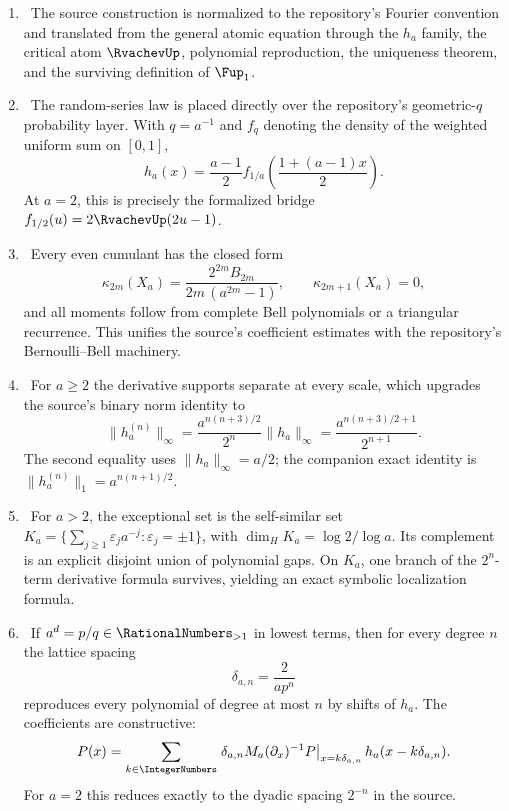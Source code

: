 \documentclass[11pt,oneside]{article}
\numberwithin{equation}{section}
\theoremstyle{definition}
\theoremstyle{remark}
\begin{document}
\begin{enumerate}
\item \sourceflag\ The source construction is normalized to the repository's
Fourier convention and translated from the general atomic equation through the
$h_a$ family, the critical atom $\RvachevUp$, polynomial reproduction, the uniqueness
theorem, and the surviving definition of $\Fup_1$.

\item \repoflag\ The random-series law is placed directly over the repository's
geometric-$q$ probability layer.  With $q=a^{-1}$ and $f_q$ denoting the density
of the weighted uniform sum on $[0,1]$,
\[
 h_a(x)=\frac{a-1}{2}
 f_{1/a}\!\left(\frac{1+(a-1)x}{2}\right).
\]
At $a=2$, this is precisely the formalized bridge
$f_{1/2}(u)=2\RvachevUp(2u-1)$.

\item \newflag\ Every even cumulant has the closed form
\[
 \kappa_{2m}(X_a)=
 \frac{2^{2m}B_{2m}}{2m\,(a^{2m}-1)},
 \qquad \kappa_{2m+1}(X_a)=0,
\]
and all moments follow from complete Bell polynomials or a triangular recurrence.
This unifies the source's coefficient estimates with the repository's
Bernoulli--Bell machinery.

\item \newflag\ For $a\ge2$ the derivative supports separate at every scale,
which upgrades the source's binary norm identity to
\[
 \|h_a^{(n)}\|_\infty
 =\frac{a^{n(n+3)/2}}{2^n}\|h_a\|_\infty
 =\frac{a^{n(n+3)/2+1}}{2^{n+1}}.
\]
The second equality uses $\|h_a\|_\infty=a/2$; the companion exact identity is
   $\|h_a^{(n)}\|_1=a^{n(n+1)/2}$.

\item \newflag\ For $a>2$, the exceptional set is the self-similar set
$K_a=\{\sum_{j\ge1}\varepsilon_j a^{-j}:\varepsilon_j=\pm1\}$, with
$\dim_H K_a=\log 2/\log a$.  Its complement is an explicit disjoint union of
polynomial gaps.  On $K_a$, one branch of the $2^n$-term derivative formula
survives, yielding an exact symbolic localization formula.

\item \newflag\ If $a^d=p/q\in\RationalNumbers_{>1}$ in lowest terms, then for every degree
$n$ the lattice spacing
\[
 \delta_{a,n}=\frac{2}{a p^n}
\]
reproduces every polynomial of degree at most $n$ by shifts of $h_a$.  The
coefficients are constructive:
\[
 P(x)=\sum_{k\in\IntegerNumbers}
 \left.\delta_{a,n}M_a(\partial_x)^{-1}P\right|_{x=k\delta_{a,n}}
 h_a(x-k\delta_{a,n}).
\]
For $a=2$ this reduces exactly to the dyadic spacing $2^{-n}$ in the source.


\end{enumerate}
\end{document}
